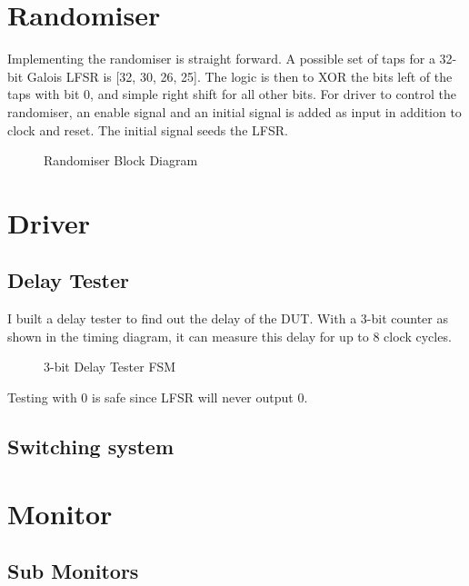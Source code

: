 \section{Randomiser}

Implementing the randomiser is straight forward.
A possible set of taps for a 32-bit Galois LFSR is [32, 30, 26, 25].
The logic is then to XOR the bits left of the taps with bit 0, and simple right shift for all other bits.
For driver to control the randomiser, an enable signal and an initial signal is added as input in addition to clock and reset.
The initial signal seeds the LFSR.

\begin{figure}[ht]
  \centering
  
  \caption{Randomiser Block Diagram}
  \label{RandomiserBlk}
\end{figure}

\section{Driver}



\subsection{Delay Tester}

I built a delay tester to find out the delay of the DUT.
With a 3-bit counter as shown in the timing diagram, it can measure this delay for up to 8 clock cycles.

\begin{figure}[ht]
  \centering
  
  \caption{3-bit Delay Tester FSM}
  \label{DelayTester}
\end{figure}
Testing with 0 is safe since LFSR will never output 0.

\subsection{Switching system}

\section{Monitor}
\subsection{Sub Monitors}

